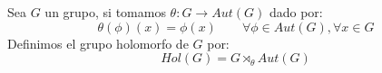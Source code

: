 \begin{definicion}
    Sea $G$ un grupo, si tomamos $\theta:G\to Aut(G)$ dado por:
    \begin{equation*}
        \theta(\phi)(x) = \phi(x) \qquad \forall \phi \in Aut(G), \forall x\in G
    \end{equation*}
    Definimos el grupo holomorfo de $G$ por:
    \begin{equation*}
        Hol(G) = G\rtimes_\theta Aut(G)
    \end{equation*}
\end{definicion}



